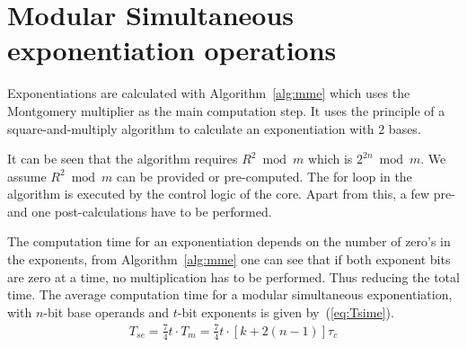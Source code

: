 \section{Modular Simultaneous exponentiation operations}
Exponentiations are calculated with Algorithm~\ref{alg:mme} which uses the Montgomery multiplier as the main computation
step. It uses the principle of a square-and-multiply algorithm to calculate an exponentiation with 2 bases.
It can be seen that the algorithm requires $R^{2}\bmod m$ which is $2^{2n}\bmod m$. We assume $R^2 \bmod m$ can be
provided or pre-computed. The for loop in the algorithm is executed by the control logic of the core. Apart from this,
a few pre- and one post-calculations have to be performed.

The computation time for an exponentiation depends on the number of zero's in the exponents, from
Algorithm~\ref{alg:mme} one can see that if both exponent bits are zero at a time, no multiplication has to be
performed. Thus reducing the total time. The average computation time for a modular simultaneous exponentiation, with
$n$-bit base operands and $t$-bit exponents is given by~(\ref{eq:Tsime}).
\begin{align}\label{eq:Tsime}
T_{se} = \frac{7}{4} t \cdot T_{m} = \frac{7}{4}t \cdot [k + 2(n - 1)] \tau_c 
\end{align}

